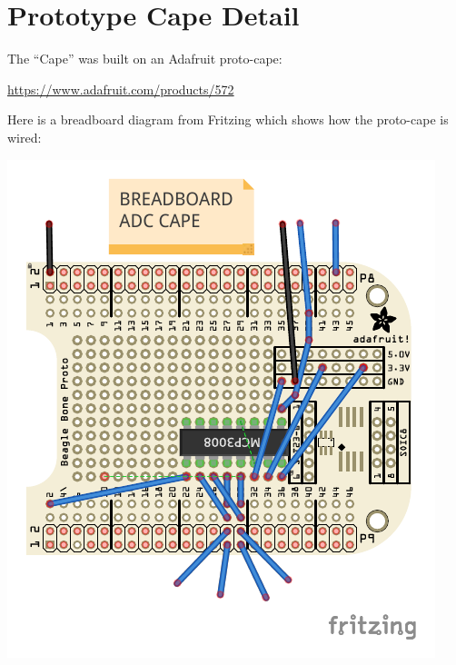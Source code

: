 %
%
%

\chapter{Prototype Cape Detail}


The ``Cape'' was built on an Adafruit proto-cape:

\url{https://www.adafruit.com/products/572}

Here is a breadboard diagram from Fritzing which shows how the proto-cape
is wired:

\includegraphics{../../pcb/adafruit_proto_cape_bb}

